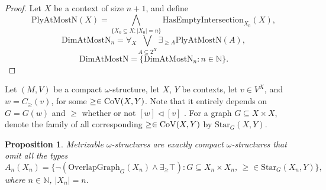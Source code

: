 \documentclass[12pt]{amsart}
\theoremstyle{plain}
\newtheorem{proposition}[theorem]{\bf Proposition}
\newcommand \Val{{\rm{CoV}}}
\newcommand \NN{\mathbb{N}}
\newcommand \PPb{\mathbb{P}}
\begin{document}
%
%
%


\begin{proof}
	Let $X$ be a context of size $n+1$,  and define
	\[\text{PlyAtMostN}(X)= \bigwedge_{\{X_0 \subseteq X: |X_0|=n\}} \text{HasEmptyIntersection}_{X_0}(X),\]
	\[\text{DimAtMostN}_n=\forall_X \bigvee_{A \subseteq 2^X} \exists_{\geq A} \text{PlyAtMostN}(A),\]
	\[\text{DimAtMostN}=\{\text{DimAtMostN}_n: n \in \NN \}.\]
\end{proof}
%

Let $(M,V)$ be a compact $\omega$-structure, let $X$, $Y$ be contexts, let $v \in V^X$, and $w=C_\geq(v)$, for some $\geq \in \Val(X,Y)$. %
Note that it entirely depends on $G=G(w)$ and $\geq$ whether or not $[w] \lhd [v]$ . For a graph $G \subseteq X \times X$, denote the family of all corresponding $\geq \in \Val(X,Y)$ by $\mbox{Star}_G(X,Y)$.

%


\begin{proposition}
	Metrizable $\omega$-structures are exactly compact $\omega$-structures that omit all the types
	\[ A_n(X_n)=\{ \neg(\mbox{OverlapGraph}_G(X_n) \wedge  \exists_{\geq} \top): G \subseteq X_n\times X_n, \, \geq \in \mbox{Star}_G(X_n,Y) \},\]
	where $n \in \NN$, $|X_n|=n$.
\end{proposition}
\end{document}
